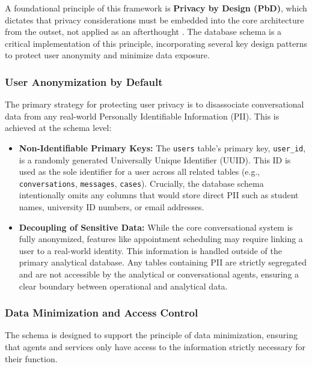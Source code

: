 A foundational principle of this framework is \textbf{Privacy by Design (PbD)}, which dictates that privacy considerations must be embedded into the core architecture from the outset, not applied as an afterthought \cite{FIND_CITATION_HERE}. The database schema is a critical implementation of this principle, incorporating several key design patterns to protect user anonymity and minimize data exposure.

\subsubsection{User Anonymization by Default}
The primary strategy for protecting user privacy is to disassociate conversational data from any real-world Personally Identifiable Information (PII). This is achieved at the schema level:

\begin{itemize}
    \item \textbf{Non-Identifiable Primary Keys:} The \texttt{users} table's primary key, \texttt{user\_id}, is a randomly generated Universally Unique Identifier (UUID). This ID is used as the sole identifier for a user across all related tables (e.g., \texttt{conversations}, \texttt{messages}, \texttt{cases}). Crucially, the database schema intentionally omits any columns that would store direct PII such as student names, university ID numbers, or email addresses.
    \item \textbf{Decoupling of Sensitive Data:} While the core conversational system is fully anonymized, features like appointment scheduling may require linking a user to a real-world identity. This information is handled outside of the primary analytical database. Any tables containing PII are strictly segregated and are not accessible by the analytical or conversational agents, ensuring a clear boundary between operational and analytical data.
\end{itemize}

\subsubsection{Data Minimization and Access Control}
The schema is designed to support the principle of data minimization, ensuring that agents and services only have access to the information strictly necessary for their function.

